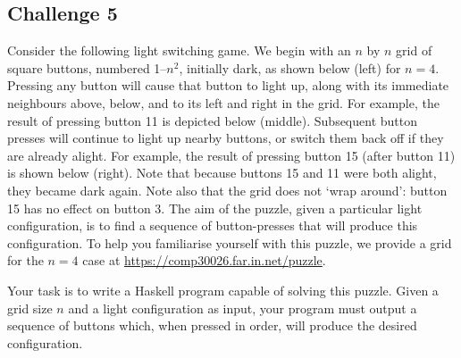 \documentclass[12pt]{article}
\begin{document}
\subsection*{Challenge 5}

Consider the following light switching game. We begin with an $n$
by $n$ grid of square buttons, numbered 1--$n^2$, initially dark,
as shown below (left) for $n=4$.
Pressing any button will cause that button to light up, along with its
immediate neighbours above, below, and to its left and right in the
grid.
For example, the result of pressing button 11 is depicted below (middle).
Subsequent button presses will continue to light up nearby buttons, or
switch them back off if they are already alight.
For example, the result of pressing button 15 (after button 11) is shown
below (right).
Note that because buttons 15 and 11 were both alight, they became dark
again.
Note also that the grid does not `wrap around': button 15 has no effect
on button 3.
The aim of the puzzle, given a particular light configuration, is to
find a sequence of button-presses that will produce this configuration.
To help you familiarise yourself with this puzzle, we provide a grid
for the $n=4$ case at \url{https://comp30026.far.in.net/puzzle}.
\begin{center}
\qquad\qquad
{}
\qquad\qquad
{}
\end{center}
Your task is to write a Haskell program capable of solving this puzzle.
Given a grid size $n$ and a light configuration as input, your program
must output a sequence of buttons which, when pressed in order, will
produce the desired configuration.
\end{document}
